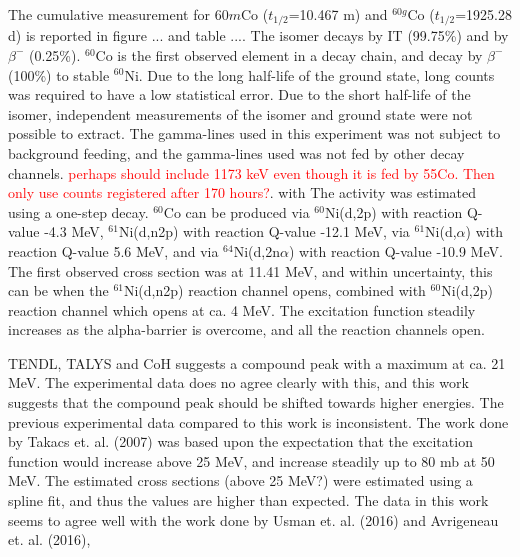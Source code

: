 \documentclass[a4paper,11pt,twoside]{book}
\begin{document}
\subsubsection{}
The cumulative measurement for $60m$Co ($t_{1/2}$=10.467 m) and $^{60g}$Co ($t_{1/2}$=1925.28 d) \cite{Browne2013} is reported in figure ... and table .... The isomer decays by IT (99.75\%) and by $\beta^-$ (0.25\%). $^{60}$Co is the first observed element in a decay chain, and decay by $\beta^-$ (100\%) to stable $^{60}$Ni. Due to the long half-life of the ground state, long counts was required to have a low statistical error. Due to the short half-life of the isomer, independent measurements of the isomer and ground state were not possible to extract. The gamma-lines used in this experiment was not subject to background feeding, and the gamma-lines used was not fed by other decay channels. 
\textcolor{red}{perhaps should include 1173 keV even though it is fed by 55Co. Then only use counts registered after 170 hours?}. with  The activity was estimated using a one-step decay. $^{60}$Co can be produced via $^{60}$Ni(d,2p) with reaction Q-value -4.3 MeV, $^{61}$Ni(d,n2p) with reaction Q-value -12.1 MeV, via $^{61}$Ni(d,$\alpha$) with reaction Q-value 5.6 MeV, and via $^{64}$Ni(d,2n$\alpha$) with reaction Q-value -10.9 MeV. The first observed cross section was at 11.41 MeV, and within uncertainty, this can be when the $^{61}$Ni(d,n2p) reaction channel opens, combined with $^{60}$Ni(d,2p) reaction channel which opens at ca. 4 MeV. The excitation function steadily increases as the alpha-barrier is overcome, and all the reaction channels open. 

TENDL, TALYS and CoH suggests a compound peak with a maximum at ca. 21 MeV. The experimental data does no agree clearly with this, and this work suggests that the compound peak should be shifted towards higher energies. The previous experimental data \cite{Avrigeanu2016, Usman2016, Hermanne2013, Takacs2007} compared to this work is inconsistent. The work done by Takacs et. al. (2007) was based upon the expectation that the excitation function would increase above 25 MeV, and increase steadily up to 80 mb at 50 MeV. The  estimated cross sections (above 25 MeV?) were estimated using a spline fit, and thus the values are higher than expected. The data in this work seems to agree well with the work done by Usman et. al. (2016) and Avrigeneau et. al. (2016), 
\end{document}
